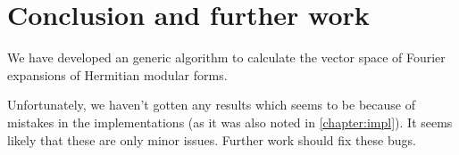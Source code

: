 
\section{Conclusion and further work}

We have developed an generic algorithm to calculate the vector space of Fourier expansions of Hermitian modular forms.

Unfortunately, we haven't gotten any results which seems to be because of mistakes in the implementations (as it was also noted in \cref{chapter:impl}). It seems likely that these are only minor issues. Further work should fix these bugs.

